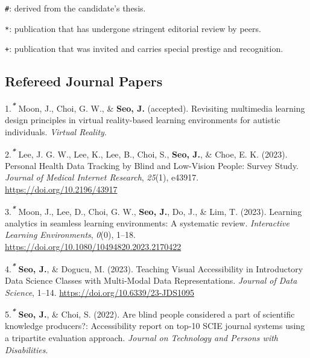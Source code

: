 \documentclass[11pt,a4paper,]{awesome-cv}
\begin{document}
\texttt{\#}: derived from the candidate's thesis.

\texttt{*}: publication that has undergone stringent editorial review by
peers.

\texttt{+}: publication that was invited and carries special prestige
and recognition.

\hypertarget{refereed-journal-papers}{%
\subsection{Refereed Journal Papers}\label{refereed-journal-papers}}

\hypertarget{bibliography}{}
\leavevmode{}%
1.\textsuperscript{\textbf{\emph{*}}} Moon, J., Choi, G. W., \&
\textbf{Seo, J.} (accepted). Revisiting multimedia learning design
principles in virtual reality-based learning environments for autistic
individuals. \emph{Virtual Reality}.

\leavevmode{}%
2.\textsuperscript{\textbf{\emph{*}}} Lee, J. G. W., Lee, K., Lee, B.,
Choi, S., \textbf{Seo, J.}, \& Choe, E. K. (2023). Personal Health Data
Tracking by Blind and Low-Vision People: Survey Study. \emph{Journal of
Medical Internet Research}, \emph{25}(1), e43917.
\url{https://doi.org/10.2196/43917}

\leavevmode{}%
3.\textsuperscript{\textbf{\emph{*}}} Moon, J., Lee, D., Choi, G. W.,
\textbf{Seo, J.}, Do, J., \& Lim, T. (2023). Learning analytics in
seamless learning environments: A systematic review. \emph{Interactive
Learning Environments}, \emph{0}(0), 1--18.
\url{https://doi.org/10.1080/10494820.2023.2170422}

\leavevmode{}%
4.\textsuperscript{\textbf{\emph{*}}} \textbf{Seo, J.}, \& Dogucu, M.
(2023). Teaching Visual Accessibility in Introductory Data Science
Classes with Multi-Modal Data Representations. \emph{Journal of Data
Science}, 1--14. \url{https://doi.org/10.6339/23-JDS1095}

\leavevmode{}%
5.\textsuperscript{\textbf{\emph{*}}} \textbf{Seo, J.}, \& Choi, S.
(2022). Are blind people considered a part of scientific knowledge
producers?: Accessibility report on top-10 SCIE journal systems using a
tripartite evaluation approach. \emph{Journal on Technology and Persons
with Disabilities}.
\end{document}
